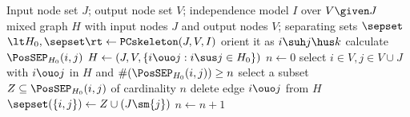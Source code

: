 \begin{algorithm}
  \begin{algorithmic}[1]
  \Input Input node set $J$; output node set $V$; independence model $I$ over $V \given J$
  \Output mixed graph $H$ with input nodes $J$ and output nodes $V$; separating sets $\sepset$
  \State $\lt H_0,\sepset \rt \leftarrow \mathtt{PCskeleton}(J,V,I)$ \label{alg:fci_skeleton2:cpc_skeleton}
   
      \State orient it as $i \suh j \hus k$
    \EndIf
  \EndFor\label{alg:fci_skeleton2:oriented_unshielded_colliders}
   
    \State calculate $\PosSEP_{H_0}(i,j)$
  \EndFor
    \State $H \leftarrow (J,V,\{i \ouo j : i \sus j \in H_0 \})$  \label{alg:fci_skeleton2:construct_skeleton_start}
  \State $n \leftarrow 0$
    \Repeat {}
    \Repeat
    \State select $i \in V, j \in V \cup J$ with $i \ouo j$ in $H$ and $\#(\PosSEP_{H_0}(i,j)) \ge n$
    \State select a subset $Z \subseteq \PosSEP_{H_0}(i,j)$ of cardinality $n$
      \State delete edge $i \ouo j$ from $H$
      \State $\sepset(\{i,j\}) \leftarrow Z \cup (J \sm \{j\})$
    \EndIf
    \State $n \leftarrow n + 1$
    \label{alg:fci_skeleton2:construct_skeleton_end}
  \end{algorithmic}
  \caption{Extended FCI skeleton algorithm $\mathtt{FCIskeleton}(J,V,I)$.\label{alg:fci_skeleton}}
\end{algorithm}

